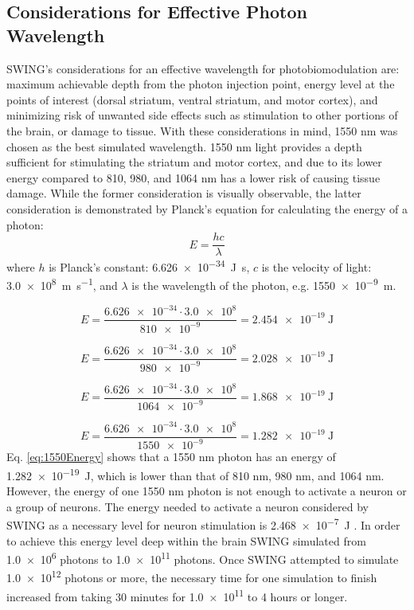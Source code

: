 \documentclass[journal,twoside,web]{ieeecolor}
\begin{document}
\subsection{Considerations for Effective Photon Wavelength}
SWING's considerations for an effective wavelength for photobiomodulation are: maximum achievable depth from the photon injection point, energy level at the points of interest 
(dorsal striatum, ventral striatum, and motor cortex), and minimizing risk of unwanted side effects such as stimulation to other portions 
of the brain, or damage to tissue. With these considerations in mind, 1550 nm was chosen as the best simulated wavelength. 1550 nm light 
provides a depth sufficient for stimulating the striatum and motor cortex, and due to its lower energy compared to 810, 980, and 1064 nm has a 
lower risk of causing tissue damage. While the former consideration is visually observable, the latter consideration is demonstrated by 
Planck's equation for calculating the energy of a photon:
\begin{equation}
    \label{eq:PhotonEnergy}
    E = \frac{hc}{\lambda}
\end{equation}
where $h$ is Planck's constant: \SI{6.626e-34}{\joule\second}, $c$ is the velocity of light: \SI{3.0e8}{\meter\per\second}, and $\lambda$ is 
the wavelength of the photon, e.g. \SI{1550e-9}{\meter}. 

\begin{equation}
    \label{eq:810Energy}
    E = \frac{\num{6.626e-34}\cdot\num{3.0e8}}{\num{810e-9}} = \SI{2.454e-19}{\joule}
\end{equation}

\begin{equation}
    \label{eq:980Energy}
    E = \frac{\num{6.626e-34}\cdot\num{3.0e8}}{\num{980e-9}} = \SI{2.028e-19}{\joule}
\end{equation}

\begin{equation}
    \label{eq:1064Energy}
    E = \frac{\num{6.626e-34}\cdot\num{3.0e8}}{\num{1064e-9}} = \SI{1.868e-19}{\joule}
\end{equation}

\begin{equation}
    \label{eq:1550Energy}
    E = \frac{\num{6.626e-34}\cdot\num{3.0e8}}{\num{1550e-9}} = \SI{1.282e-19}{\joule}
\end{equation}
Eq. \eqref{eq:1550Energy} shows that a 1550 nm photon has an energy of \SI{1.282e-19}{\joule}, which is lower than that of 810 nm, 980 nm, and 1064 nm. However, 
the energy of one 1550 nm photon is not enough to activate a neuron or a group of neurons. The energy needed to activate a neuron considered by SWING as a 
necessary level for neuron stimulation is \SI{2.468e-7}{\joule} \cite{b8}. In order to achieve this energy level deep within the brain SWING simulated from 
\num{1.0e6} photons to \num{1.0e11} photons. Once SWING attempted to simulate \num{1.0e12} photons or more, the necessary time for one simulation to finish 
increased from taking 30 minutes for \num{1.0e11} to 4 hours or longer.
\end{document}
